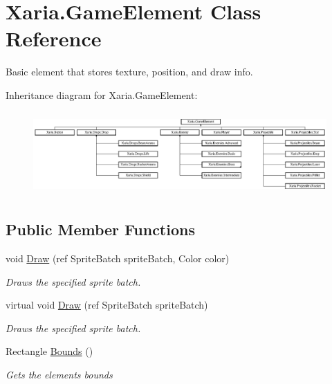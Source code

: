 \hypertarget{classXaria_1_1GameElement}{}\section{Xaria.\+Game\+Element Class Reference}
\label{classXaria_1_1GameElement}


Basic element that stores texture, position, and draw info.  


Inheritance diagram for Xaria.\+Game\+Element\+:\begin{figure}[H]
\begin{center}
\leavevmode
\includegraphics[height=3.218391cm]{classXaria_1_1GameElement}
\end{center}
\end{figure}
\subsection*{Public Member Functions}
\begin{DoxyCompactItemize}
\item 
void \hyperlink{classXaria_1_1GameElement_a7f93dc93e970e72a5540924e06d28c92}{Draw} (ref Sprite\+Batch sprite\+Batch, Color color)
\begin{DoxyCompactList}\small\item\em Draws the specified sprite batch. \end{DoxyCompactList}\item 
virtual void \hyperlink{classXaria_1_1GameElement_a812e0ffbe54519a3fb14a49115bf43d9}{Draw} (ref Sprite\+Batch sprite\+Batch)
\begin{DoxyCompactList}\small\item\em Draws the specified sprite batch. \end{DoxyCompactList}\item 
Rectangle \hyperlink{classXaria_1_1GameElement_a2b050e61aea8232eba3e820b14c98656}{Bounds} ()
\begin{DoxyCompactList}\small\item\em Gets the element\textquotesingle{}s bounds \end{DoxyCompactList}\end{DoxyCompactItemize}
